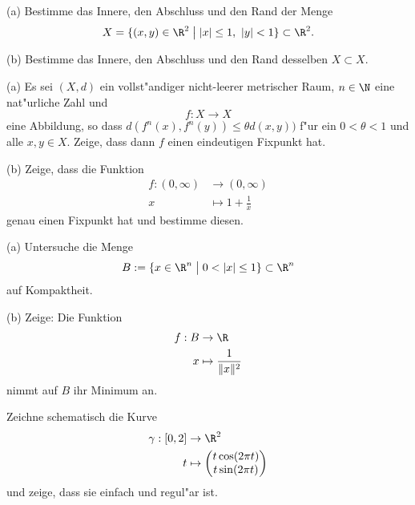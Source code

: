 \vspace{0.3cm}

\begin{prob}
(a) Bestimme das Innere, den Abschluss und den Rand der Menge
$$X=\{(x,y)\in\R^2\;\bigl|\;|x|\leq 1,\ |y|<1\}\subset\R^2.$$

(b) Bestimme das Innere, den Abschluss und den Rand desselben $X\subset X$.
\end{prob}

\vspace{0.3cm}

\begin{prob}
(a) Es sei $(X,d)$ ein vollst"andiger nicht-leerer metrischer Raum, $n\in\N$ eine nat"urliche Zahl und
$$f:X\to X$$
eine Abbildung, so dass $d(f^n(x),f^n(y))\leq \theta d(x,y))$ f"ur ein $0<\theta<1$ und alle $x,y\in X$. Zeige, dass dann $f$ einen eindeutigen Fixpunkt hat.

(b) Zeige, dass die Funktion
\begin{equation*}
\begin{split}
f:(0,\infty)&\to(0,\infty)\\
x&\mapsto 1+\frac{1}{x}
\end{split}
\end{equation*}
 genau einen Fixpunkt hat und bestimme diesen.
\end{prob}

\vspace{0.3cm}

\begin{prob}
(a) Untersuche die Menge 
$$B:=\{x\in\R^n\;\bigl|\;0<|x|\leq 1\} \subset \R^n$$ auf Kompaktheit.

(b) Zeige: Die Funktion 
\begin{equation*}
\begin{split}
f:B&\to\R\\
x&\mapsto \frac{1}{\|x\|^2}
\end{split}
\end{equation*}
nimmt auf $B$ ihr Minimum an.
\end{prob}

\vspace{0.3cm}

\begin{prob}
Zeichne schematisch die Kurve
\begin{equation*}
\begin{split}
\gamma:[0,2]&\to\R^2\\
t&\mapsto \begin{pmatrix}
t\cos(2\pi t)\\
t\sin(2\pi t)\\
\end{pmatrix}
\end{split}
\end{equation*}
und zeige, dass sie einfach und regul"ar ist.
\end{prob}

